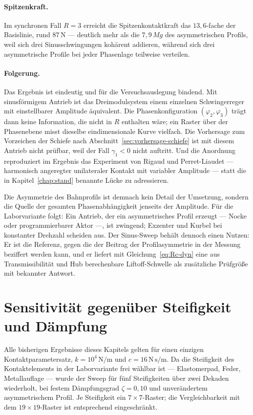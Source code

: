 \documentclass[12pt,a4paper]{report}
\begin{document}
\paragraph{Spitzenkraft.}
Im synchronen Fall $R = 3$ erreicht die Spitzenkontaktkraft das
$13{,}6$-fache der Basislinie, rund $87\,\mathrm{N}$ --- deutlich mehr
als die $7{,}9\,Mg$ des asymmetrischen Profils, weil sich drei
Sinusschwingungen kohärent addieren, während sich drei asymmetrische
Profile bei jeder Phasenlage teilweise verteilen.

\paragraph{Folgerung.}
Das Ergebnis ist eindeutig und für die Versuchsauslegung bindend. Mit
sinusförmigem Antrieb ist das Dreimodulsystem einem einzelnen
Schwingerreger mit einstellbarer Amplitude äquivalent. Die
Phasenkonfiguration $(\varphi_2, \varphi_3)$ trägt dann keine
Information, die nicht in $R$ enthalten wäre; ein Raster über der
Phasenebene misst dieselbe eindimensionale Kurve vielfach. Die
Vorhersage zum Vorzeichen der Schiefe nach
Abschnitt~\ref{sec:vorhersage-schiefe} ist mit diesem Antrieb nicht
prüfbar, weil der Fall $\gamma_1 < 0$ nicht auftritt. Und die
Anordnung reproduziert im Ergebnis das Experiment von Rigaud und
Perret-Liaudet \cite{rigaud2003} --- harmonisch angeregter unilateraler
Kontakt mit variabler Amplitude --- statt die in
Kapitel~\ref{chap:stand} benannte Lücke zu adressieren.

Die Asymmetrie des Bahnprofils ist demnach kein Detail der Umsetzung,
sondern die Quelle der gesamten Phasenabhängigkeit jenseits der
Amplitude. Für die Laborvariante folgt: Ein Antrieb, der ein asymmetrisches Profil
erzeugt --- Nocke oder programmierbarer Aktor ---, ist zwingend;
Exzenter und Kurbel bei konstanter Drehzahl scheiden aus. Der Sinus-Sweep behält
dennoch einen Nutzen: Er ist die Referenz, gegen die der Beitrag der
Profilasymmetrie in der Messung beziffert werden kann, und er liefert
mit Gleichung~\eqref{eq:Rc-dyn} eine aus Transmissibilität und
Hub berechenbare Liftoff-Schwelle als zusätzliche Prüfgröße mit
bekannter Antwort.

\section{Sensitivität gegenüber Steifigkeit und Dämpfung}
\label{sec:sens-k}

Alle bisherigen Ergebnisse dieses Kapitels gelten für einen einzigen
Kontaktparametersatz, $k = 10^{4}\,\mathrm{N/m}$ und
$c = 16\,\mathrm{N\,s/m}$. Da die Steifigkeit des Kontaktelements in der
Laborvariante frei wählbar ist --- Elastomerpad, Feder, Metallauflage ---
wurde der Sweep für fünf Steifigkeiten über zwei Dekaden wiederholt, bei
festem Dämpfungsgrad $\zeta = 0{,}10$ und unverändertem asymmetrischem
Profil. Je Steifigkeit ein $7\times7$-Raster; die Vergleichbarkeit mit
dem $19\times19$-Raster ist entsprechend eingeschränkt.
\end{document}
